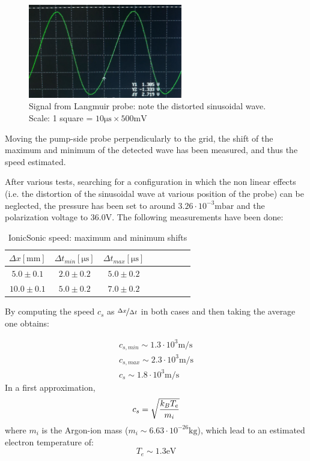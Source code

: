 \documentclass[11pt,a4 paper]{article}
\let\oldfrac\frac
\renewcommand{\frac}[3][d]{\ifthenelse{\equal{#1}{d}}{\oldfrac{#2}{#3}}{\nicefrac{#2}{#3}}}
\begin{document}
\begin{figure}[H]
  \centering
  \includegraphics[width=0.6\textwidth]{img/ionicsonic/oscill.jpg}
  \caption{Signal from Langmuir probe: note the distorted sinusoidal wave. Scale: 1 square = $10\si{\micro\second}\times500\si{\milli\volt}$}
  \label{fig:isspeed:oscill}
\end{figure}

Moving the pump-side probe perpendicularly to the grid, the shift of the maximum and minimum of the detected wave has been measured, and thus the speed estimated.

After various tests, searching for a configuration in which the non linear effects (i.e. the distortion of the sinusoidal wave at various position of the probe) can be neglected, the pressure has been set to around $3.26\cdot10^{-3}\si{\milli\bar}$ and the polarization voltage to $36.0\si{\volt}$. The following measurements have been done:
\begin{table}[H]
  \centering
  \begin{tabular}{cccccccc}
    \toprule
    $\Delta x [\si{\milli\metre}]$ & $\Delta t_{min} [\si{\micro\second}]$ & $\Delta t_{max} [\si{\micro\second}]$ \\
    \midrule
    $5.0\pm0.1$ & $2.0\pm0.2$ & $5.0\pm0.2$\\
    $10.0\pm0.1$ & $5.0\pm0.2$ & $7.0\pm0.2$\\
    \bottomrule
  \end{tabular}
  \caption{IonicSonic speed: maximum and minimum shifts}
  \label{tab:isspeed}
\end{table}

By computing the speed $c_s$ as $\frac[f]{\Delta x}{\Delta t}$ in both cases and then taking the average one obtains:

\begin{gather*}
  c_{s,min} \sim 1.3\cdot10^{3} \si{\metre\per\second} \\
  c_{s,max} \sim 2.3\cdot10^{3} \si{\metre\per\second} \\
  c_s \sim 1.8\cdot10^{3} \si{\metre\per\second}
\end{gather*}
In a first approximation,
\begin{equation*}
  c_s = \sqrt{\frac{k_B T_e}{m_i}}
\end{equation*}
where $m_i$ is the Argon-ion mass ($m_i\sim6.63\cdot10^{-26}\si{\kilo\gram}$), which lead to an estimated electron temperature of:
\begin{equation*}
  T_e \sim 1.3\si{\electronvolt}
\end{equation*}
\end{document}
